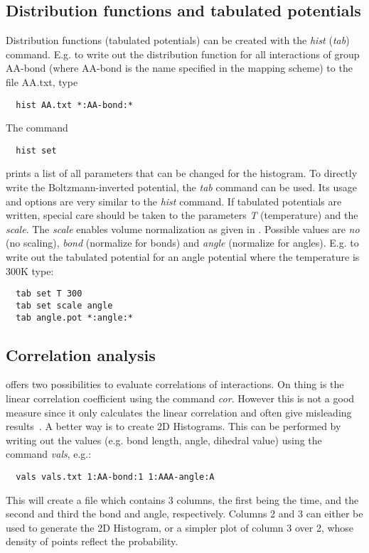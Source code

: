 \subsection{Distribution functions and tabulated potentials}
Distribution functions (tabulated potentials) can be created with the \textit{hist} (\textit{tab}) command.
E.g. to write out the distribution function for all interactions of group AA-bond (where AA-bond is the name specified in the mapping scheme) to the file AA.txt, type
\begin{verbatim}
  hist AA.txt *:AA-bond:*
\end{verbatim}
The command
\begin{verbatim}
  hist set
\end{verbatim}
prints a list of all parameters that can be changed for the histogram. To directly write the Boltzmann-inverted potential, the \textit{tab} command can be used. Its usage and options are very similar to the \textit{hist} command. If tabulated potentials are written, special care should be taken to the parameters \textit{T} (temperature) and the \textit{scale}. The \textit{scale} enables volume normalization as given in . Possible values are \textit{no} (no scaling), \textit{bond} (normalize for bonds) and \textit{angle} (normalize for angles). E.g. to write out the tabulated potential for an angle potential where the temperature is 300K type:
\begin{verbatim}
  tab set T 300
  tab set scale angle
  tab angle.pot *:angle:*
\end{verbatim}

\subsection{Correlation analysis}
 offers two possibilities to evaluate correlations of interactions. On thing is the linear correlation coefficient using the command \textit{cor}. However this is not a good measure since it only calculates the linear correlation and often give misleading results~\cite{Ruehle:2009.a}. A better way is to create 2D Histograms. This can be performed by writing out the values (e.g. bond length, angle, dihedral value) using the command \textit{vals}, e.g.:
\begin{verbatim}
  vals vals.txt 1:AA-bond:1 1:AAA-angle:A
\end{verbatim}
This will create a file which contains 3 columns, the first being the time, and the second and third the bond and angle, respectively. Columns 2 and 3 can either be used to generate the 2D Histogram, or a simpler plot of column 3 over 2, whose density of points reflect the probability.
